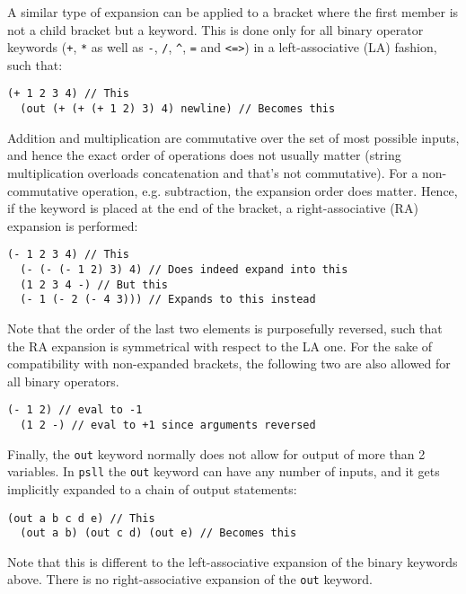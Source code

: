\documentclass[aip,jcp,reprint,footinbib]{revtex4-1}
\makeatletter
\let\tt\texttt
\newcommand\psll{\texttt{psll}\xspace}
\renewcommand\paragraph{\@startsection{paragraph}{4}{\parindent}{\parskip}{-1em}{\normalfont \normalsize \bfseries}}
\makeatother
\begin{document}
\paragraph{Expansion of binary operators} A similar type of expansion can be applied to a bracket where the first member is not a child bracket but a keyword. This is done only for all binary operator keywords (\tt{+}, \tt{*} as well as \tt{-}, \tt{/}, \tt{\^}, \tt{=} and \tt{<=>}) in a left-associative (LA) fashion, such that:
\begin{lstlisting}[language=psll,aboveskip=3pt,belowskip=-2pt,frame=none,numbers=none]
  (+ 1 2 3 4) // This
  (out (+ (+ (+ 1 2) 3) 4) newline) // Becomes this
\end{lstlisting}
Addition and multiplication are commutative over the set of most possible inputs, and hence the exact order of operations does not usually matter (string multiplication overloads concatenation and that's not commutative). For a non-commutative operation, e.g. subtraction, the expansion order does matter. Hence, if the keyword is placed at the end of the bracket, a right-associative (RA) expansion is performed:
\begin{lstlisting}[language=psll,aboveskip=3pt,belowskip=-2pt,frame=none,numbers=none]
  (- 1 2 3 4) // This
  (- (- (- 1 2) 3) 4) // Does indeed expand into this
  (1 2 3 4 -) // But this
  (- 1 (- 2 (- 4 3))) // Expands to this instead
\end{lstlisting}
Note that the order of the last two elements is purposefully reversed, such that the RA expansion is symmetrical with respect to the LA one. For the sake of compatibility with non-expanded brackets, the following two are also allowed for all binary operators.
\begin{lstlisting}[language=psll,aboveskip=3pt,belowskip=-2pt,frame=none,numbers=none]
  (- 1 2) // eval to -1
  (1 2 -) // eval to +1 since arguments reversed
\end{lstlisting}

Finally, the \tt{out} keyword normally does not allow for output of more than 2 variables. In \psll the \tt{out} keyword can have any number of inputs, and it gets implicitly expanded to a chain of output statements: 
\begin{lstlisting}[language=psll,aboveskip=3pt,belowskip=-2pt,frame=none,numbers=none]
  (out a b c d e) // This
  (out a b) (out c d) (out e) // Becomes this
\end{lstlisting}
Note that this is different to the left-associative expansion of the binary keywords above. There is no right-associative expansion of the \tt{out} keyword.
\end{document}
